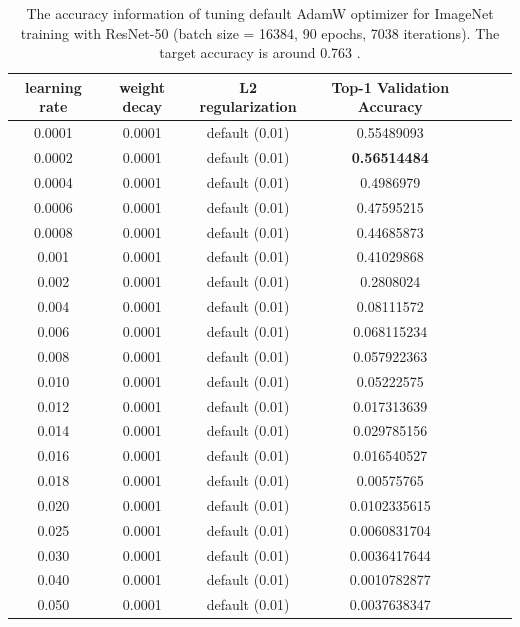 \begin{table}[ht]
\renewcommand{\arraystretch}{1.3}
\caption{The accuracy information of tuning default AdamW optimizer for ImageNet training with ResNet-50 (batch size = 16384, 90 epochs, 7038 iterations). The target accuracy is around 0.763 \citep{goyal2017accurate}.}
\centering
\begin{tabular}{|c|c|c|c|c|c|c|}
\hline
learning rate & weight decay & L2 regularization & Top-1 Validation Accuracy\\
\hline
\hline
0.0001 & 0.0001 & default (0.01) & 0.55489093 \\
\hline
0.0002 & 0.0001 & default (0.01) & {\bf 0.56514484} \\
\hline
0.0004 & 0.0001 & default (0.01) & 0.4986979 \\
\hline
0.0006 & 0.0001 & default (0.01) & 0.47595215 \\
\hline
0.0008 & 0.0001 & default (0.01) & 0.44685873 \\
\hline
0.001 & 0.0001 & default (0.01) & 0.41029868 \\
\hline
0.002 & 0.0001 & default (0.01) & 0.2808024 \\
\hline
0.004 & 0.0001 & default (0.01) & 0.08111572 \\
\hline
0.006 & 0.0001 & default (0.01) & 0.068115234 \\
\hline
0.008 & 0.0001 & default (0.01) & 0.057922363 \\
\hline
0.010 & 0.0001 & default (0.01) & 0.05222575 \\
\hline
0.012 & 0.0001 & default (0.01) & 0.017313639 \\
\hline
0.014 & 0.0001 & default (0.01) & 0.029785156 \\
\hline
0.016 & 0.0001 & default (0.01) & 0.016540527 \\
\hline
0.018 & 0.0001 & default (0.01) & 0.00575765 \\
\hline
0.020 & 0.0001 & default (0.01) & 0.0102335615 \\
\hline
0.025 & 0.0001 & default (0.01) & 0.0060831704 \\
\hline
0.030 & 0.0001 & default (0.01) & 0.0036417644 \\
\hline
0.040 & 0.0001 & default (0.01) & 0.0010782877 \\
\hline
0.050 & 0.0001 & default (0.01) & 0.0037638347 \\
\hline
\end{tabular}
\label{table:imagenet_adamw_default_l2_2}
\end{table}


